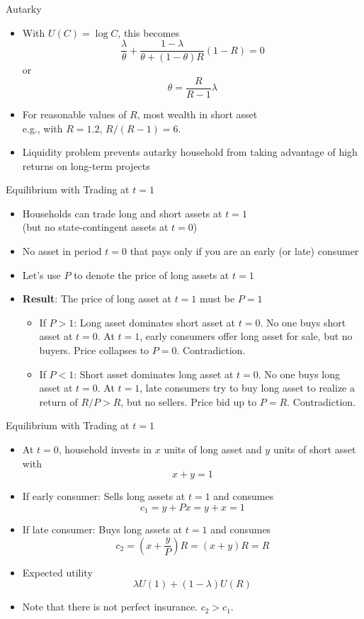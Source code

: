 \documentclass[11pt,aspectratio=169,xcolor={dvipsnames},hyperref={pdftex,pdfpagemode=UseNone,hidelinks,pdfdisplaydoctitle=true},usepdftitle=false]{beamer}
\begin{document}
\begin{frame}{Autarky}
\begin{itemize}
	\itemsep1em 
	\item With $U(C) = \log C$, this becomes
	\[ \frac{\lambda}{\theta} + \frac{1-\lambda}{\theta + (1-\theta)R}(1-R) = 0 \]
	or 
	\[ \theta = \frac{R}{R-1} \lambda \] 
	\item For reasonable values of $R$, most wealth in short asset \\ e.g., with $R = 1.2$, $R/(R-1) = 6$.
	\item Liquidity problem prevents autarky household from taking advantage of high returns on long-term projects
\end{itemize}
\end{frame}


\begin{frame}{Equilibrium with Trading at $t=1$}
\begin{itemize}
	\itemsep1em 
	\item Households can trade long and short assets at $t=1$ \\ (but no state-contingent assets at $t=0$)
	\item No asset in period $t=0$ that pays only if you are an early (or late) consumer
	\item Let's use $P$ to denote the price of long assets at $t=1$ 
	\pause
	\item \textbf{Result}: The price of long asset at $t=1$ must be $P=1$
	\begin{itemize}
		\item If $P > 1$: Long asset dominates short asset at $t=0$. No one buys short asset at $t=0$. At $t=1$, early consumers offer long asset for sale, but no buyers. Price collapses to $P = 0$. Contradiction.
		\item If $P < 1$: Short asset dominates long asset at $t=0$. No one buys long asset at $t=0$. At $t=1$, late consumers try to buy long asset to realize a return of $R/P > R$, but no sellers. Price bid up to $P = R$. Contradiction. 
	\end{itemize}

\end{itemize}
\end{frame}


\begin{frame}{Equilibrium with Trading at $t=1$}
\begin{itemize}
	\item At $t=0$, household invests in $x$ units of long asset and $y$ units of short asset with
	\[ x + y = 1 \] 
	\item If early consumer: Sells long assets at $t=1$ and consumes
	\[c_1 = y + Px = y + x = 1\]
	\item If late consumer: Buys long assets at $t=1$ and consumes
	\[c_2 = (x + \frac{y}{P})R = (x+y)R = R \] 
	\item Expected utility
	\[ \lambda U(1) + (1-\lambda)U(R) \] 
	\item Note that there is not perfect insurance. $c_2 > c_1$.
\end{itemize}
\end{frame}
\end{document}
